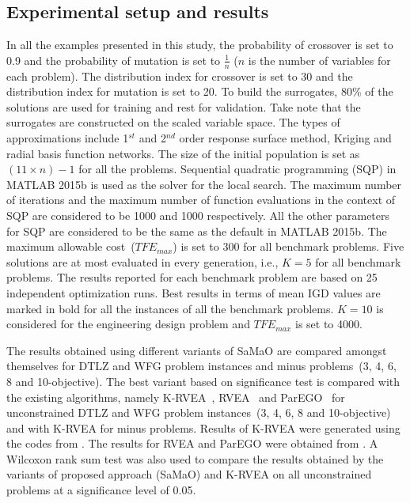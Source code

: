 \documentclass[twocolumn,10pt]{asme2ej}
\begin{document}
\subsection{Experimental setup and results}
\label{subsec:KHTsubsec:2}
In all the examples presented in this study, the probability of crossover is set to 0.9 and the probability of mutation is set to $\frac{1}{n}$ ($n$ is the number of variables for each problem). The distribution index for crossover is set to 30 and the distribution index for mutation is set to 20. To build the surrogates, 80\% of the solutions are used for training and rest for validation. Take note that the surrogates are constructed on the scaled variable space. The types of approximations include 1$^{st}$ and 2$^{nd}$ order response surface method, Kriging and radial basis function networks. The size of the initial population is set as $(11\times n)-1$ for all the problems. Sequential quadratic programming (SQP) in MATLAB 2015b is used as the solver for the local search. The maximum number of iterations and the maximum number of function evaluations in the context of SQP are considered to be 1000 and 1000 respectively. All the other parameters for SQP are considered to be the same as the default in MATLAB 2015b. The maximum allowable cost~($TFE_{max}$) is set to 300 for all benchmark problems. Five solutions are at most evaluated in every generation, i.e., $K = 5$ for all benchmark problems. The results reported for each benchmark problem are based on 25 independent optimization runs. Best results in terms of mean IGD values are marked in bold for all the instances of all the benchmark problems. $K = 10$ is considered for the engineering design problem and $TFE_{max}$ is set to 4000.

The results obtained using different variants of SaMaO are compared amongst themselves for DTLZ and WFG problem instances and minus problems~(3, 4, 6, 8 and 10-objective). The best variant based on significance test is compared with the existing algorithms, namely K-RVEA~\cite{KHTchugh2016krvea}, RVEA~\cite{KHTCheng2016many} and ParEGO~\cite{KHTknowles2006pha} for unconstrained DTLZ and WFG problem instances~(3, 4, 6, 8 and 10-objective) and with K-RVEA for minus problems. Results of K-RVEA were generated using the codes from \cite{KHTplatemo}. The results for RVEA and ParEGO were obtained from \cite{KHTchugh2016krvea}. A Wilcoxon rank sum test was also used to compare the results obtained by the variants of proposed approach (SaMaO) and K-RVEA on all unconstrained problems at a significance level of 0.05. 
\end{document}
